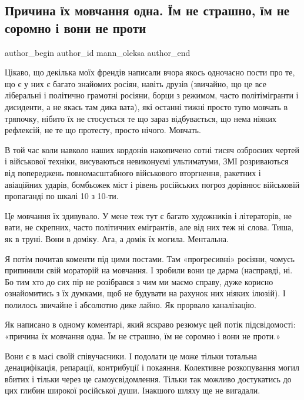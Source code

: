  
 
 
 
 
 
\subsection{Причина їх мовчання одна. Їм не страшно, їм не соромно і вони не проти}
\label{sec:25_01_2022.fb.mann_oleksa.1.molchanie_rossiane}
 
\ifcmt
 author_begin
   author_id mann_oleksa
 author_end
\fi

Цікаво, що декілька моїх френдів написали вчора якось одночасно пости про те,
що є у них є багато знайомих росіян, навіть друзів (звичайно, що це все
ліберальні і політично грамотні росіяни, борци з режимом, часто політімігранти
і дисиденти, а не якась там дика вата), які останні тижні просто тупо мовчать в
тряпочку, нібито їх не стосується те що зараз відбувається, що нема ніяких
рефлексій, не те що протесту, просто нічого. Мовчать. 

В той час коли навколо наших кордонів накопичено сотні тисяч озброєних чертей і
військової техніки, висуваються невиконуємі ультиматуми, ЗМІ розриваються від
попереджень повномасштабного військового вторгнення, ракетних і авіаційних
ударів, бомбьожек міст і рівень російських погроз дорівнює військовій
пропаганді по шкалі 10 з 10-ти. 

Це мовчання їх здивувало. У мене теж тут є багато художників і літераторів, не
вати, не скрепних, часто політичних емігрантів, але від них теж ні слова. Тиша,
як в труні. Вони в доміку. Ага, а домік їх могила. Ментальна.  

Я потім почитав коменти під цими постами. Там «прогресивні» росіяни, чомусь
припинили свій мораторій на мовчання. І зробили вони це дарма (насправді, ні.
Бо тим хто до сих пір не розібрався з чим ми маємо справу, дуже корисно
ознайомитись з їх думками, щоб не будувати на рахунок них ніяких ілюзій). І
полилось звичайне і абсолютно дике лайно.  Як прорвало каналізацію. 

Як написано в одному коментарі, який яскраво резюмує цей потік підсвідомості:
«причина їх мовчання одна. Їм не страшно, їм не соромно і вони не проти.»

Вони є в масі своїй співучасники. І подолати це може тільки тотальна
денацифікація, репарації, контрибуції і покаяння. Колективне розкопування могил
вбитих і тільки через це самоусвідомлення. Тільки так можливо достукатись до
цих глибин широкої російської души. Інакшого шляху ще не вигадали.
